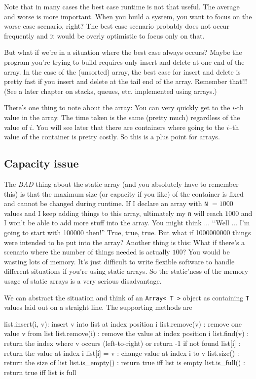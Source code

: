 Note that in many cases the best case runtime is not that useful.
The average and worse is more important.
When you build a system, you want to focus on the worse case
scenario, right?
The best case scenario probably does not occur frequently
and it would be overly optimistic to focus only on that.

But what if we're in a situation where the best case always occurs?
Maybe the program you're trying to build requires only insert
and delete at one end of the array.
In the case of the (unsorted) array, the best case for insert and delete
is pretty fast if you insert and delete at the tail end
of the array.
Remember that!!!
(See a later chapter on stacks, queues, etc. implemented using arrays.)

There's one thing to note about the array:
You can very quickly get to the $i$-th value in the array.
The time taken is the same (pretty much) regardless of the value of $i$.
You will see later that there are containers where going to the 
$i$--th value of the container is pretty costly.
So this is a plus point for arrays.



\newpage
\subsection{Capacity issue}

The \textit{BAD} thing about the static array (and you absolutely have to 
remember this) is that the maximum size 
(or capacity if you like) of the container is fixed
and cannot be changed during runtime.
If I declare an array with \verb!N! $= 1000$ values
and I keep adding things to this array, ultimately
my \verb!n! will reach $1000$ and I won't be able to 
add more stuff into the array.
You might think ... \lq\lq Well ... I'm going to start with 100000
then!''
True, true, true.
But what if 1000000000 things were intended to be put into the array?
Another thing is this:
What if there's a scenario where the number of things needed
is actually $100$?
You would be wasting lots of memory.
It's just difficult to write flexible software to handle different situations
if you're using static arrays.
So the static'ness of the memory usage of static arrays is a very
serious disadvantage.






We can abstract the situation and think of an \verb!Array< T >!
object as containing \verb!T! values laid out on a straight line.
The supporting methods are
\begin{console}[fontsize=\footnotesize]
list.insert(i, v): insert v into list at index position i
list.remove(v)   : remove one value v from list
list.remove(i)   : remove the value at index position i
list.find(v)     : return the index where v occurs (left-to-right)
                   or return -1 if not found
list[i]          : return the value at index i
list[i] = v      : change value at index i to v
list.size()      : return the size of list
list.is_empty()  : return true iff list is empty
list.is_full()   : return true iff list is full
\end{console}

